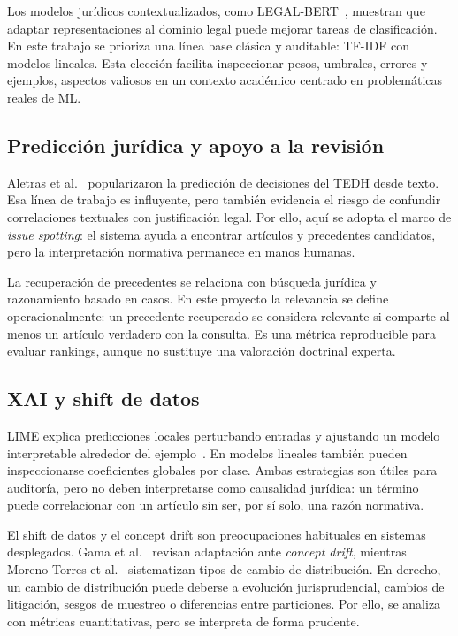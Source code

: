 \documentclass[11pt,a4paper]{article}
\begin{document}
Los modelos jurídicos contextualizados, como LEGAL-BERT~\cite{chalkidis2020legalbert}, muestran que adaptar representaciones al dominio legal puede mejorar tareas de clasificación. En este trabajo se prioriza una línea base clásica y auditable: TF-IDF con modelos lineales. Esta elección facilita inspeccionar pesos, umbrales, errores y ejemplos, aspectos valiosos en un contexto académico centrado en problemáticas reales de ML.

\subsection{Predicción jurídica y apoyo a la revisión}

Aletras et al.~\cite{aletras2016predicting} popularizaron la predicción de decisiones del TEDH desde texto. Esa línea de trabajo es influyente, pero también evidencia el riesgo de confundir correlaciones textuales con justificación legal. Por ello, aquí se adopta el marco de \textit{issue spotting}: el sistema ayuda a encontrar artículos y precedentes candidatos, pero la interpretación normativa permanece en manos humanas.

La recuperación de precedentes se relaciona con búsqueda jurídica y razonamiento basado en casos. En este proyecto la relevancia se define operacionalmente: un precedente recuperado se considera relevante si comparte al menos un artículo verdadero con la consulta. Es una métrica reproducible para evaluar rankings, aunque no sustituye una valoración doctrinal experta.

\subsection{XAI y shift de datos}

LIME explica predicciones locales perturbando entradas y ajustando un modelo interpretable alrededor del ejemplo~\cite{ribeiro2016lime}. En modelos lineales también pueden inspeccionarse coeficientes globales por clase. Ambas estrategias son útiles para auditoría, pero no deben interpretarse como causalidad jurídica: un término puede correlacionar con un artículo sin ser, por sí solo, una razón normativa.

El shift de datos y el concept drift son preocupaciones habituales en sistemas desplegados. Gama et al.~\cite{gama2014survey} revisan adaptación ante \textit{concept drift}, mientras Moreno-Torres et al.~\cite{moreno2012datasetshift} sistematizan tipos de cambio de distribución. En derecho, un cambio de distribución puede deberse a evolución jurisprudencial, cambios de litigación, sesgos de muestreo o diferencias entre particiones. Por ello, se analiza con métricas cuantitativas, pero se interpreta de forma prudente.
\end{document}
